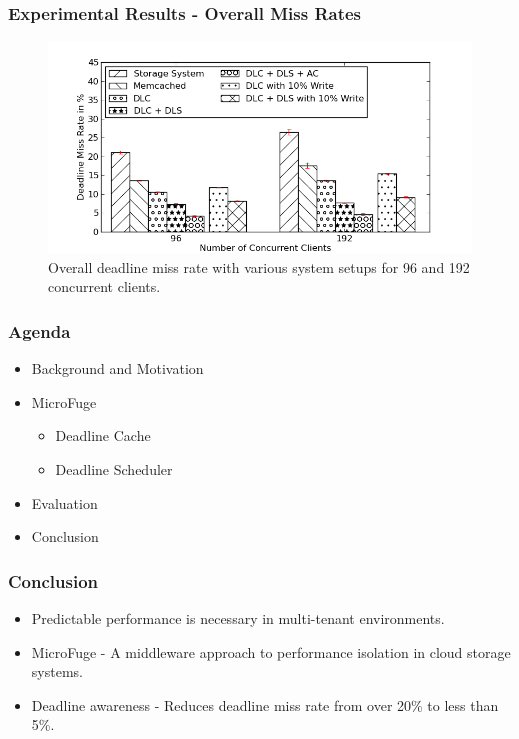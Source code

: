 \documentclass{beamer}
\begin{document}
\begin{frame}
\frametitle{Experimental Results - Overall Miss Rates}
\begin{figure}[t]
\begin{center}
\centerline{\includegraphics[scale=0.5]{img/EC2/EC2_BAR/miss_bar.png}}
\caption{Overall deadline miss rate with various system setups for
  96 and 192 concurrent clients.}
\label{fig:bar_miss}
\end{center}
\end{figure}
\end{frame}




\begin{frame}
  \frametitle{Agenda}
  \begin{itemize}
  \item[\Checkmark] Background and Motivation
  \item[\Checkmark] MicroFuge
    \begin{itemize}
    \item[\Checkmark] Deadline Cache
    \item[\Checkmark] Deadline Scheduler
    \end{itemize}
  \item[\Checkmark] Evaluation
  \item Conclusion
  \end{itemize}
\end{frame}





\begin{frame}
  \frametitle{Conclusion}
  \begin{itemize}
  \item Predictable performance is necessary in multi-tenant environments.
  \item MicroFuge - A middleware approach to performance isolation in cloud
    storage systems.
  \item Deadline awareness - Reduces deadline miss rate from over 20\% to
    less than 5\%.
  \end{itemize}
\end{frame}
\end{document}
